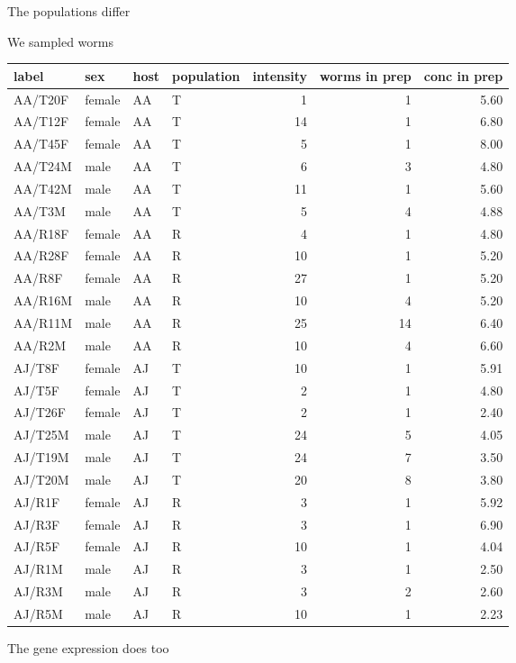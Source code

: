 \documentclass[10pt]{bmc_article}
\newenvironment{bmcformat}{\begin{raggedright}\baselineskip20pt\sloppy\setboolean{publ}{false}}{\end{raggedright}\baselineskip20pt\sloppy}
\begin{document}
\begin{bmcformat}
The populations differ


We sampled worms
\begin{table}[ht]
\begin{center}
\begin{tabular}{llllrrr}
  \hline
label & sex & host & population & intensity & worms in prep & conc in prep \\ 
  \hline
AA/T20F & female & AA & T & 1 & 1 & 5.60 \\ 
  AA/T12F & female & AA & T & 14 & 1 & 6.80 \\ 
  AA/T45F & female & AA & T & 5 & 1 & 8.00 \\ 
  AA/T24M & male & AA & T & 6 & 3 & 4.80 \\ 
  AA/T42M & male & AA & T & 11 & 1 & 5.60 \\ 
  AA/T3M & male & AA & T & 5 & 4 & 4.88 \\ 
  AA/R18F & female & AA & R & 4 & 1 & 4.80 \\ 
  AA/R28F & female & AA & R & 10 & 1 & 5.20 \\ 
  AA/R8F & female & AA & R & 27 & 1 & 5.20 \\ 
  AA/R16M & male & AA & R & 10 & 4 & 5.20 \\ 
  AA/R11M & male & AA & R & 25 & 14 & 6.40 \\ 
  AA/R2M & male & AA & R & 10 & 4 & 6.60 \\ 
  AJ/T8F & female & AJ & T & 10 & 1 & 5.91 \\ 
  AJ/T5F & female & AJ & T & 2 & 1 & 4.80 \\ 
  AJ/T26F & female & AJ & T & 2 & 1 & 2.40 \\ 
  AJ/T25M & male & AJ & T & 24 & 5 & 4.05 \\ 
  AJ/T19M & male & AJ & T & 24 & 7 & 3.50 \\ 
  AJ/T20M & male & AJ & T & 20 & 8 & 3.80 \\ 
  AJ/R1F & female & AJ & R & 3 & 1 & 5.92 \\ 
  AJ/R3F & female & AJ & R & 3 & 1 & 6.90 \\ 
  AJ/R5F & female & AJ & R & 10 & 1 & 4.04 \\ 
  AJ/R1M & male & AJ & R & 3 & 1 & 2.50 \\ 
  AJ/R3M & male & AJ & R & 3 & 2 & 2.60 \\ 
  AJ/R5M & male & AJ & R & 10 & 1 & 2.23 \\ 
   \hline
\end{tabular}
\end{center}
\end{table}
The gene expression does too





\end{bmcformat}
\end{document}
